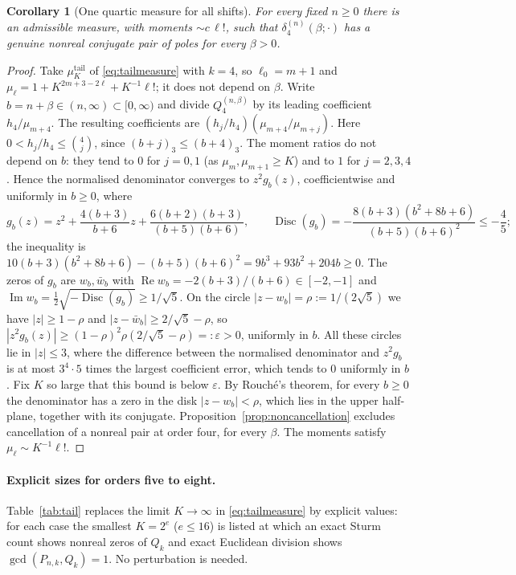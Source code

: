 \documentclass[11pt,a4paper]{article}
\newtheorem{corollary}[theorem]{Corollary}
\theoremstyle{definition}
\theoremstyle{remark}
\newcommand{\Disc}{\operatorname{Disc}}
\begin{document}
\begin{corollary}[One quartic measure for all shifts]\label{cor:allshifts}
For every fixed $n\ge0$ there is an admissible measure, with moments
$\sim c\,\ell!$, such that $\delta_4^{(n)}(\beta;\cdot)$ has a genuine nonreal
conjugate pair of poles for every $\beta>0$.
\end{corollary}
\begin{proof}
Take $\mu^{\mathrm{tail}}_K$ of \eqref{eq:tailmeasure} with $k=4$, so
$\ell_0=m+1$ and $\mu_\ell=1+K^{2m+3-2\ell}+K^{-1}\ell!$; it does not depend
on $\beta$. Write $b=n+\beta\in(n,\infty)\subset[0,\infty)$ and divide
$Q_4^{(n,\beta)}$ by its leading coefficient $h_4/\mu_{m+4}$. The resulting
coefficients are $(h_j/h_4)(\mu_{m+4}/\mu_{m+j})$. Here
$0<h_j/h_4\le\binom4j$, since $(b+j)_3\le(b+4)_3$. The moment ratios do not
depend on $b$: they tend to $0$ for $j=0,1$ (as $\mu_m,\mu_{m+1}\ge K$) and
to $1$ for $j=2,3,4$. Hence the normalised denominator converges to
$z^2g_b(z)$, coefficientwise and uniformly in $b\ge0$, where
\[
 g_b(z)=z^2+\frac{4(b+3)}{b+6}z+\frac{6(b+2)(b+3)}{(b+5)(b+6)},\qquad
 \Disc(g_b)=-\frac{8(b+3)(b^2+8b+6)}{(b+5)(b+6)^2}\le-\frac45 ;
\]
the inequality is $10(b+3)(b^2+8b+6)-(b+5)(b+6)^2=9b^3+93b^2+204b\ge0$.
The zeros of $g_b$ are $w_b,\bar w_b$ with
$\operatorname{Re}w_b=-2(b+3)/(b+6)\in[-2,-1]$ and
$\operatorname{Im}w_b=\tfrac12\sqrt{-\Disc(g_b)}\ge1/\sqrt5$. On the circle
$|z-w_b|=\rho:=1/(2\sqrt5)$ we have $|z|\ge1-\rho$ and
$|z-\bar w_b|\ge2/\sqrt5-\rho$, so
$|z^2g_b(z)|\ge(1-\rho)^2\rho(2/\sqrt5-\rho)=:\varepsilon>0$, uniformly in
$b$. All these circles lie in $|z|\le3$, where the difference between the
normalised denominator and $z^2g_b$ is at most $3^4\cdot5$ times the largest
coefficient error, which tends to $0$ uniformly in $b$. Fix $K$ so large that
this bound is below $\varepsilon$. By Rouché's theorem, for every $b\ge0$ the
denominator has a zero in the disk $|z-w_b|<\rho$, which lies in the upper
half-plane, together with its conjugate. Proposition~\ref{prop:noncancellation}
excludes cancellation of a nonreal pair at order four, for every $\beta$.
The moments satisfy $\mu_\ell\sim K^{-1}\ell!$.
\end{proof}

\paragraph{Explicit sizes for orders five to eight.}
Table~\ref{tab:tail} replaces the limit $K\to\infty$ in
\eqref{eq:tailmeasure} by explicit values: for each case the smallest
$K=2^e$ ($e\le16$) is listed at which an exact Sturm count shows nonreal
zeros of $Q_k$ and exact Euclidean division shows $\gcd(P_{n,k},Q_k)=1$. No
perturbation is needed.
\end{document}
